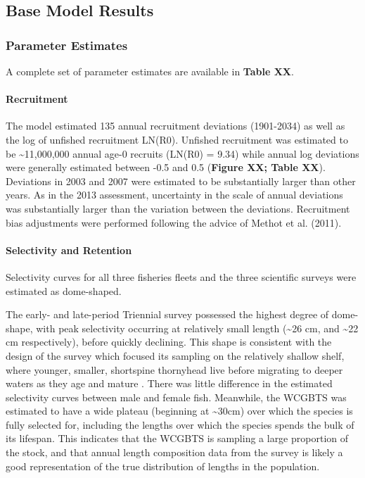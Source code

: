 \documentclass[11pt,
  english,
  letterpaper,
]{article}
\begin{document}
\hypertarget{base-model-results}{%
\subsection{Base Model Results}\label{base-model-results}}

\hypertarget{parameter-estimates}{%
\subsubsection{Parameter Estimates}\label{parameter-estimates}}

A complete set of parameter estimates are available in \textbf{Table XX}.

\hypertarget{recruitment-1}{%
\paragraph{Recruitment}\label{recruitment-1}}

The model estimated 135 annual recruitment deviations (1901-2034) as well as the log of unfished recruitment LN(R0). Unfished recruitment was estimated to be \textasciitilde11,000,000 annual age-0 recruits (LN(R0) = 9.34) while annual log deviations were generally estimated between -0.5 and 0.5 (\textbf{Figure XX; Table XX}). Deviations in 2003 and 2007 were estimated to be substantially larger than other years. As in the 2013 assessment, uncertainty in the scale of annual deviations was substantially larger than the variation between the deviations. Recruitment bias adjustments were performed following the advice of Methot et al. (2011).

\hypertarget{selectivity-and-retention-1}{%
\paragraph{Selectivity and Retention}\label{selectivity-and-retention-1}}

Selectivity curves for all three fisheries fleets and the three scientific surveys were estimated as dome-shaped.

The early- and late-period Triennial survey possessed the highest degree of dome-shape, with peak selectivity occurring at relatively small length (\textasciitilde26 cm, and \textasciitilde22 cm respectively), before quickly declining. This shape is consistent with the design of the survey which focused its sampling on the relatively shallow shelf, where younger, smaller, shortspine thornyhead live before migrating to deeper waters as they age and mature . There was little difference in the estimated selectivity curves between male and female fish. Meanwhile, the WCGBTS was estimated to have a wide plateau (beginning at \textasciitilde30cm) over which the species is fully selected for, including the lengths over which the species spends the bulk of its lifespan. This indicates that the WCGBTS is sampling a large proportion of the stock, and that annual length composition data from the survey is likely a good representation of the true distribution of lengths in the population.
\end{document}
